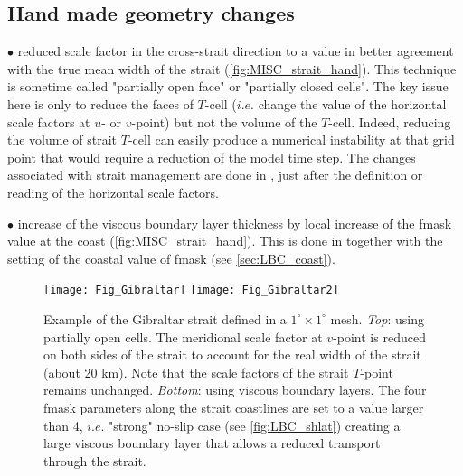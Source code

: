 \documentclass[../main/NEMO_manual]{subfiles}
\begin{document}
\subsection{Hand made geometry changes}
\label{subsec:MISC_strait_hand}

$\bullet$ reduced scale factor in the cross-strait direction to a value in better agreement with
the true mean width of the strait (\autoref{fig:MISC_strait_hand}).
This technique is sometime called "partially open face" or "partially closed cells".
The key issue here is only to reduce the faces of $T$-cell
($i.e.$ change the value of the horizontal scale factors at $u$- or $v$-point) but not the volume of the $T$-cell.
Indeed, reducing the volume of strait $T$-cell can easily produce a numerical instability at
that grid point that would require a reduction of the model time step.
The changes associated with strait management are done in ,
just after the definition or reading of the horizontal scale factors. 

$\bullet$ increase of the viscous boundary layer thickness by local increase of the fmask value at the coast
(\autoref{fig:MISC_strait_hand}).
This is done in  together with the setting of the coastal value of fmask (see  \autoref{sec:LBC_coast}).

\begin{figure}[!tbp]
  \begin{center}
    \texttt{[image: Fig\_Gibraltar]}
    \texttt{[image: Fig\_Gibraltar2]}
    \caption{
      \protect\label{fig:MISC_strait_hand}
      Example of the Gibraltar strait defined in a $1^{\circ} \times 1^{\circ}$ mesh.
      \textit{Top}: using partially open cells.
      The meridional scale factor at $v$-point is reduced on both sides of the strait to account for
      the real width of the strait (about 20 km).
      Note that the scale factors of the strait $T$-point remains unchanged.
      \textit{Bottom}: using viscous boundary layers.
      The four fmask parameters along the strait coastlines are set to a value larger than 4,
      $i.e.$ "strong" no-slip case (see \autoref{fig:LBC_shlat}) creating a large viscous boundary layer that
      allows a reduced transport through the strait.
    }
  \end{center}
\end{figure}
\end{document}
